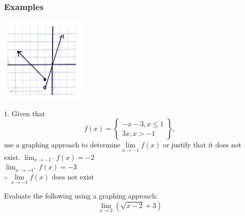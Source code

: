 \documentclass{article}
\begin{document}
\subsubsection*{Examples}
\begin{minipage}{0.35\textwidth}
    \includegraphics[width=\textwidth]{imgs/ex1.png}
\end{minipage}
\hspace{0.05\textwidth}
\begin{minipage}{0.6\textwidth}
    $\text{1. Given that}$
    $$f(x)=\left\{\begin{array}{c}
    -x-3, x \leq 1 \\
    3 x, x>-1
    \end{array}\right\},$$
    $\text{use a graphing approach to determine} \lim\limits_{x \to -1} f(x)$ or justify that it does not exist.
    $\lim_{x \to -1^-}f(x)=-2$\\
    $\lim_{x\ \to -1^+}f(x)=-3$\\
   $\boxed{\therefore\ \lim\limits_{x \to -1} f(x)\text{ does not exist}}$
    \vspace{1cm}
\end{minipage}
Evaluate the following using a graphing approach:
\[
\lim_{x \to 2}\left(\sqrt{x-2}+3\right)
\]
\noindent
\begin{minipage}[t]{0.5\textwidth}
    \vspace{0pt}
\end{minipage}
\end{document}
